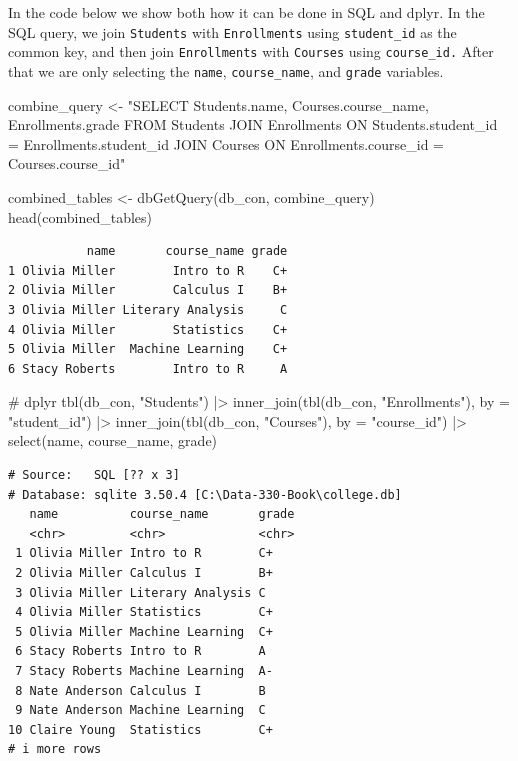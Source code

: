 \documentclass[
  letterpaper,
  DIV=11,
  numbers=noendperiod]{scrreprt}
\newenvironment{Shaded}{\begin{snugshade}}{\end{snugshade}}
\newcommand{\AttributeTok}[1]{\textcolor[rgb]{0.40,0.45,0.13}{#1}}
\newcommand{\CommentTok}[1]{\textcolor[rgb]{0.37,0.37,0.37}{#1}}
\newcommand{\FunctionTok}[1]{\textcolor[rgb]{0.28,0.35,0.67}{#1}}
\newcommand{\NormalTok}[1]{\textcolor[rgb]{0.00,0.23,0.31}{#1}}
\newcommand{\OtherTok}[1]{\textcolor[rgb]{0.00,0.23,0.31}{#1}}
\newcommand{\SpecialCharTok}[1]{\textcolor[rgb]{0.37,0.37,0.37}{#1}}
\newcommand{\StringTok}[1]{\textcolor[rgb]{0.13,0.47,0.30}{#1}}
\begin{document}
In the code below we show both how it can be done in SQL and dplyr. In
the SQL query, we join \texttt{Students} with \texttt{Enrollments} using
\texttt{student\_id} as the common key, and then join
\texttt{Enrollments} with \texttt{Courses} using \texttt{course\_id.}
After that we are only selecting the \texttt{name},
\texttt{course\_name}, and \texttt{grade} variables.

\begin{Shaded}
\begin{Highlighting}[]
\NormalTok{combine\_query }\OtherTok{\textless{}{-}} \StringTok{"SELECT Students.name, Courses.course\_name, Enrollments.grade}
\StringTok{                  FROM Students}
\StringTok{                  JOIN Enrollments ON Students.student\_id = Enrollments.student\_id}
\StringTok{                  JOIN Courses ON Enrollments.course\_id = Courses.course\_id"}

\NormalTok{combined\_tables }\OtherTok{\textless{}{-}} \FunctionTok{dbGetQuery}\NormalTok{(db\_con, combine\_query)}
\FunctionTok{head}\NormalTok{(combined\_tables)}
\end{Highlighting}
\end{Shaded}

\begin{verbatim}
           name       course_name grade
1 Olivia Miller        Intro to R    C+
2 Olivia Miller        Calculus I    B+
3 Olivia Miller Literary Analysis     C
4 Olivia Miller        Statistics    C+
5 Olivia Miller  Machine Learning    C+
6 Stacy Roberts        Intro to R     A
\end{verbatim}

\begin{Shaded}
\begin{Highlighting}[]
\CommentTok{\# dplyr}
\FunctionTok{tbl}\NormalTok{(db\_con, }\StringTok{"Students"}\NormalTok{) }\SpecialCharTok{|\textgreater{}}
  \FunctionTok{inner\_join}\NormalTok{(}\FunctionTok{tbl}\NormalTok{(db\_con, }\StringTok{"Enrollments"}\NormalTok{), }\AttributeTok{by =} \StringTok{"student\_id"}\NormalTok{) }\SpecialCharTok{|\textgreater{}}
  \FunctionTok{inner\_join}\NormalTok{(}\FunctionTok{tbl}\NormalTok{(db\_con, }\StringTok{"Courses"}\NormalTok{), }\AttributeTok{by =} \StringTok{"course\_id"}\NormalTok{) }\SpecialCharTok{|\textgreater{}}
  \FunctionTok{select}\NormalTok{(name, course\_name, grade)}
\end{Highlighting}
\end{Shaded}

\begin{verbatim}
# Source:   SQL [?? x 3]
# Database: sqlite 3.50.4 [C:\Data-330-Book\college.db]
   name          course_name       grade
   <chr>         <chr>             <chr>
 1 Olivia Miller Intro to R        C+   
 2 Olivia Miller Calculus I        B+   
 3 Olivia Miller Literary Analysis C    
 4 Olivia Miller Statistics        C+   
 5 Olivia Miller Machine Learning  C+   
 6 Stacy Roberts Intro to R        A    
 7 Stacy Roberts Machine Learning  A-   
 8 Nate Anderson Calculus I        B    
 9 Nate Anderson Machine Learning  C    
10 Claire Young  Statistics        C+   
# i more rows
\end{verbatim}
\end{document}
